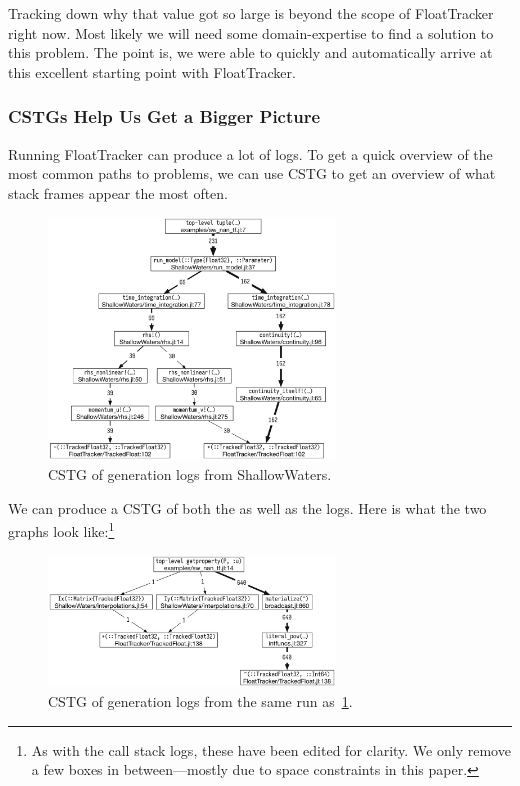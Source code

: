 \documentclass{juliacon}
\begin{document}
Tracking down why that value got so large is beyond the scope of FloatTracker right now.
Most likely we will need some domain-expertise to find a solution to this problem.
The point is, we were able to quickly and automatically arrive at this excellent starting point with FloatTracker.

\subsubsection{CSTGs Help Us Get a Bigger Picture}

Running FloatTracker can produce a lot of logs.
To get a quick overview of the most common paths to problems, we can use CSTG to get an overview of what stack frames appear the most often.

\begin{figure}
  \centering
  \includegraphics[width=3in]{fig/sw_nan_cstg_clean.png}
  \caption{CSTG of \NaN{} generation logs from ShallowWaters.}
  \label{fig:sw_nan_cstg}
\end{figure}

We can produce a CSTG of both the \Inf{} as well as the \NaN{} logs.
Here is what the two graphs look like:\footnote{As with the call stack logs, these have been edited for clarity. We only remove a few boxes in between—mostly due to space constraints in this paper.}

\begin{figure}
  \centering
  \includegraphics[width=3in]{fig/sw_inf_cstg_clean.png}
  \caption{CSTG of \Inf{} generation logs from the same run as~\cref{fig:sw_nan_cstg}.}
  \label{fig:sw_inf_cstg}
\end{figure}
\end{document}
